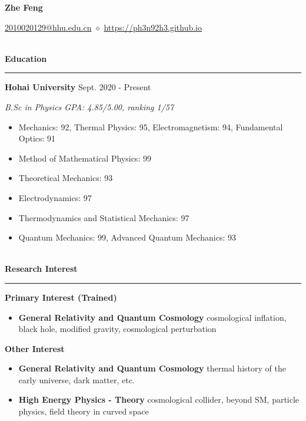 \documentclass[12pt]{article}
\newcommand{\sect}[1]{
    ~\\ \noindent \textbf{#1} \medskip \hrule \medskip
}
\begin{document}
\pagestyle{empty}


\begin{center}
    \LARGE{\textbf{Zhe Feng}}
\end{center}

\begin{center}
    \href{mailto:2010020129@hhu.edu.cn}{2010020129@hhu.edu.cn} $\diamond$ \href{https://ph3n92h3.github.io}{https://ph3n92h3.github.io}
\end{center}


\sect{Education}

\textbf{Hohai University} \hfill Sept. 2020 - Present

\textit{B.Sc in Physics \hfill GPA: 4.85/5.00, ranking 1/57}

\begin{itemize}[noitemsep,nolistsep]
    \item Mechanics: 92, Thermal Physics: 95, Electromagnetism: 94, Fundamental Optics: 91
    \item Method of Mathematical Physics: 99
    \item Theoretical Mechanics: 93
    \item Electrodynamics: 97
    \item Thermodynamics and Statistical Mechanics: 97
    \item Quantum Mechanics: 99, Advanced Quantum Mechanics: 93
\end{itemize}


\sect{Research Interest}

\textbf{Primary Interest (Trained)}
\begin{itemize}[noitemsep,nolistsep]
    \item \textbf{General Relativity and Quantum Cosmology} cosmological inflation, black hole, modified gravity, cosmological perturbation
\end{itemize}

\textbf{Other Interest}
\begin{itemize}[noitemsep,nolistsep]
    \item \textbf{General Relativity and Quantum Cosmology} thermal history of the early universe, dark matter, etc.
    \item \textbf{High Energy Physics - Theory} cosmological collider, beyond SM, particle physics, field theory in curved space
\end{itemize}
\end{document}
